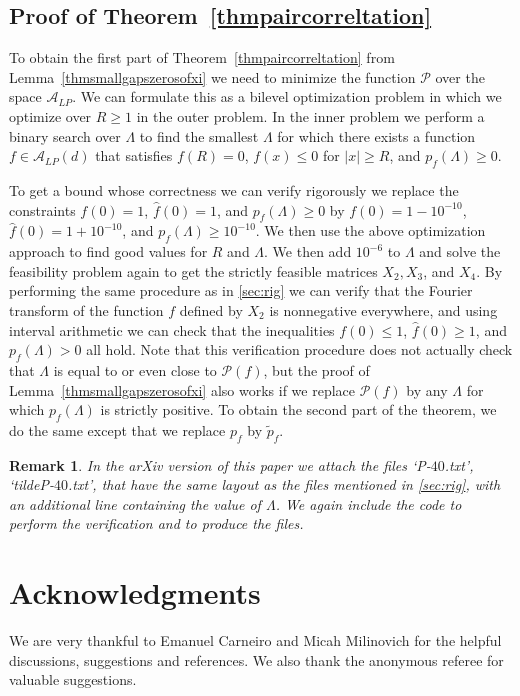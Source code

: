 \documentclass[reqno]{amsart}
\newtheorem{remark}{Remark}
\newcommand{\A}{\mathcal{A}}
\renewcommand{\P}{\mathcal{P}}
\newcommand{\ft}{\widehat}
\newcommand{\wt}{\widetilde}
\begin{document}
\subsection{Proof of Theorem~\ref{thmpaircorreltation}}

To obtain the first part of Theorem~\ref{thmpaircorreltation} from Lemma~\ref{thmsmallgapszerosofxi} we need to minimize the function $\P$ over the space $\A_{LP}$. We can formulate this as a bilevel optimization problem in which we optimize over $R \geq 1$ in the outer problem. In the inner problem we perform a binary search over $\Lambda$ to find the smallest $\Lambda$ for which there exists a function $f \in \A_{LP}(d)$ that satisfies $f(R) = 0$, $f(x) \leq 0$ for $|x| \geq R$, and $p_f(\Lambda) \geq 0$.


To get a bound whose correctness we can verify rigorously we replace the constraints $f(0)=1$, $\ft f(0) = 1$, and $p_f(\Lambda) \geq 0$ by $f(0) = 1-10^{-10}$, $\ft f(0) = 1+10^{-10}$, and $p_f(\Lambda) \geq 10^{-10}$. We then use the above optimization approach to find good values for $R$ and $\Lambda$. We then add $10^{-6}$ to $\Lambda$ and solve the feasibility problem again to get the strictly feasible matrices $X_2,X_3$, and $X_4$.  By performing the same procedure as in \ref{sec:rig} we can verify that the Fourier transform of the function $f$ defined by $X_2$ is nonnegative everywhere, and using interval arithmetic we can check that the inequalities $f(0) \leq 1$, $\ft f(0) \geq 1$, and $p_f(\Lambda) > 0$ all hold. Note that this verification procedure does not actually check that $\Lambda$ is equal to or even close to $\P(f)$, but the proof of Lemma~\ref{thmsmallgapszerosofxi} also works if we replace $\P(f)$  by any $\Lambda$ for which $p_f(\Lambda)$ is strictly positive. To obtain the second part of the theorem, we do the same except that we replace $p_f$ by $\wt p_f$.

\begin{remark}
In the arXiv version of this paper we attach the files `P-$40$.txt', `tildeP-$40$.txt', that have the same layout as the files mentioned in \ref{sec:rig}, with an additional line containing the value of $\Lambda$. We again include the code to perform the verification and to produce the files.
\end{remark}

\section*{Acknowledgments}
We are very thankful to Emanuel Carneiro and Micah Milinovich for the helpful discussions, suggestions and references. We also thank the anonymous referee for valuable suggestions.
\end{document}
